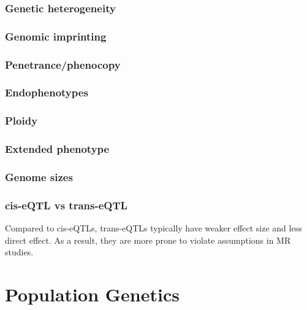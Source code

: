 \documentclass[
]{book}
\begin{document}
\hypertarget{genetic-heterogeneity}{%
\section{Genetic heterogeneity}\label{genetic-heterogeneity}}

\hypertarget{genomic-imprinting}{%
\section{Genomic imprinting}\label{genomic-imprinting}}

\hypertarget{penetrancephenocopy}{%
\section{Penetrance/phenocopy}\label{penetrancephenocopy}}

\hypertarget{endophenotypes}{%
\section{Endophenotypes}\label{endophenotypes}}

\hypertarget{ploidy}{%
\section{Ploidy}\label{ploidy}}

\hypertarget{extended-phenotype}{%
\section{Extended phenotype}\label{extended-phenotype}}

\hypertarget{genome-sizes}{%
\section{Genome sizes}\label{genome-sizes}}

\hypertarget{cis-eqtl-vs-trans-eqtl}{%
\section{cis-eQTL vs trans-eQTL}\label{cis-eqtl-vs-trans-eqtl}}

Compared to cis-eQTLs, trans-eQTLs typically have weaker effect size and less direct effect. As a result, they are more prone to violate assumptions in MR studies.

\hypertarget{part-population-genetics}{%
\part{Population Genetics}\label{part-population-genetics}}
\end{document}
